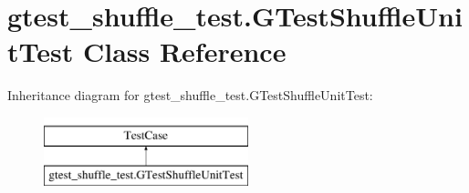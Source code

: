\hypertarget{classgtest__shuffle__test_1_1_g_test_shuffle_unit_test}{\section{gtest\-\_\-shuffle\-\_\-test.\-G\-Test\-Shuffle\-Unit\-Test Class Reference}
\label{classgtest__shuffle__test_1_1_g_test_shuffle_unit_test}
}
Inheritance diagram for gtest\-\_\-shuffle\-\_\-test.\-G\-Test\-Shuffle\-Unit\-Test\-:\begin{figure}[H]
\begin{center}
\leavevmode
\includegraphics[height=2.000000cm]{classgtest__shuffle__test_1_1_g_test_shuffle_unit_test}
\end{center}
\end{figure}
